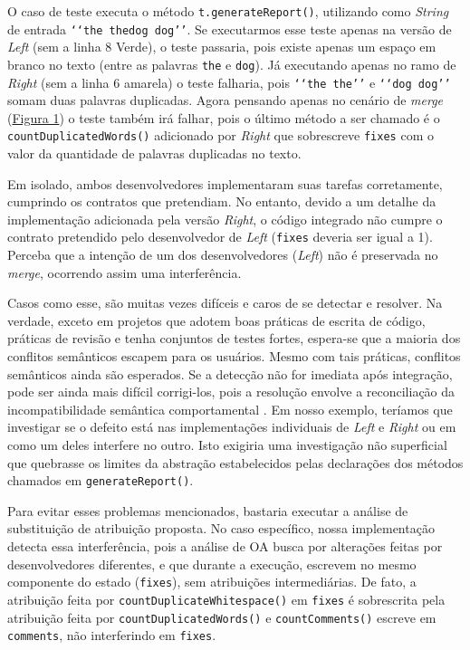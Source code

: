 O caso de teste executa o método \texttt{t.generateReport()}, utilizando como \emph{String} de entrada \texttt{‘‘the the\quad dog dog’’}. Se executarmos esse teste apenas na versão de \emph{Left} (sem a linha 8 Verde), o teste passaria, pois existe apenas um espaço em branco no texto (entre as palavras \texttt{the} e \texttt{dog}). Já executando apenas no ramo de \emph{Right} (sem a linha 6 amarela) o teste falharia, pois \texttt{‘‘the the’’} e \texttt{‘‘dog dog’’} somam duas palavras duplicadas. Agora pensando apenas no cenário de \emph{merge} (\hyperref[fig:codigo-motivador]{Figura 1}) o teste também irá falhar, pois o último método a ser chamado é o \texttt{countDuplicatedWords()} adicionado por \emph{Right} que sobrescreve \texttt{fixes} com o valor da quantidade de palavras duplicadas no texto.

Em isolado, ambos desenvolvedores implementaram suas tarefas corretamente, cumprindo os contratos que pretendiam. No entanto, devido a um detalhe da implementação adicionada pela versão \emph{Right}, o código integrado não cumpre o contrato pretendido pelo desenvolvedor de \emph{Left} (\texttt{fixes} deveria ser igual a 1). Perceba que a intenção de um dos desenvolvedores (\emph{Left}) não é preservada no \emph{merge}, ocorrendo assim uma interferência. 

Casos como esse, são muitas vezes difíceis e caros de se detectar e resolver. Na verdade, exceto em projetos que adotem boas práticas de escrita de código, práticas de revisão e tenha conjuntos de testes fortes, espera-se que a maioria dos conflitos semânticos escapem para os usuários. Mesmo com tais práticas, conflitos semânticos ainda são esperados. Se a detecção não for imediata após integração, pode ser ainda mais difícil corrigi-los, pois a resolução envolve a reconciliação da incompatibilidade semântica comportamental \cite{LeusonSilva2020}. Em nosso exemplo, teríamos que investigar se o defeito está nas implementações individuais de \emph{Left} e \emph{Right} ou em como um deles interfere no outro. Isto exigiria uma investigação não superficial que quebrasse os limites da abstração estabelecidos pelas declarações dos métodos chamados em \texttt{generateReport()}.

Para evitar esses problemas mencionados, bastaria executar a análise de substituição de atribuição proposta. No caso específico, nossa implementação detecta essa interferência, pois a análise de OA busca por alterações feitas por desenvolvedores diferentes, e que durante a execução, escrevem no mesmo componente do estado (\texttt{fixes}), sem atribuições intermediárias. De fato, a atribuição feita por \texttt{countDuplicateWhitespace()} em \texttt{fixes} é sobrescrita pela atribuição feita por \texttt{countDuplicatedWords()} e \texttt{countComments()} escreve em \texttt{comments}, não interferindo em \texttt{fixes}. 


